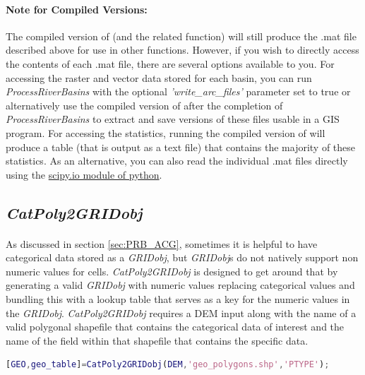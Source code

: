 \paragraph{Note for Compiled Versions:} The compiled version of  (and the related  function) will still produce the .mat file described above for use in other functions. However, if you wish to directly access the contents of each .mat file, there are several options available to you. For accessing the raster and vector data stored for each basin, you can run \textit{ProcessRiverBasins} with the optional \textit{'write\_arc\_files'} parameter set to true or alternatively use the compiled version of  after the completion of \textit{ProcessRiverBasins} to extract and save versions of these files usable in a GIS program. For accessing the statistics, running the compiled version of  will produce a table (that is output as a text file) that contains the majority of these statistics. As an alternative, you can also read the individual .mat files directly using the \href{https://docs.scipy.org/doc/scipy/reference/tutorial/io.html}{scipy.io module of python}.

\subsection{\textit{CatPoly2GRIDobj}} \label{sec:CatGrid}
\paragraph{}As discussed in section \ref{sec:PRB_ACG}, sometimes it is helpful to have categorical data stored as a \textit{GRIDobj}, but \textit{GRIDobj}s  do not natively support non numeric values for cells. \textit{CatPoly2GRIDobj} is designed to get around that by generating a valid \textit{GRIDobj} with numeric values replacing categorical values and bundling this with a lookup table that serves as a key for the numeric values in the \textit{GRIDobj}. \textit{CatPoly2GRIDobj} requires a DEM input along with the name of a valid polygonal shapefile that contains the categorical data of interest and the name of the field within that shapefile that contains the specific data. 

\begin{lstlisting}[language=Matlab]
% Generate a categorical grid and lookup table for a geologic map for the rock type field with the name 'PTYPE' in the input shapefile
[GEO,geo_table]=CatPoly2GRIDobj(DEM,'geo_polygons.shp','PTYPE');
\end{lstlisting}

